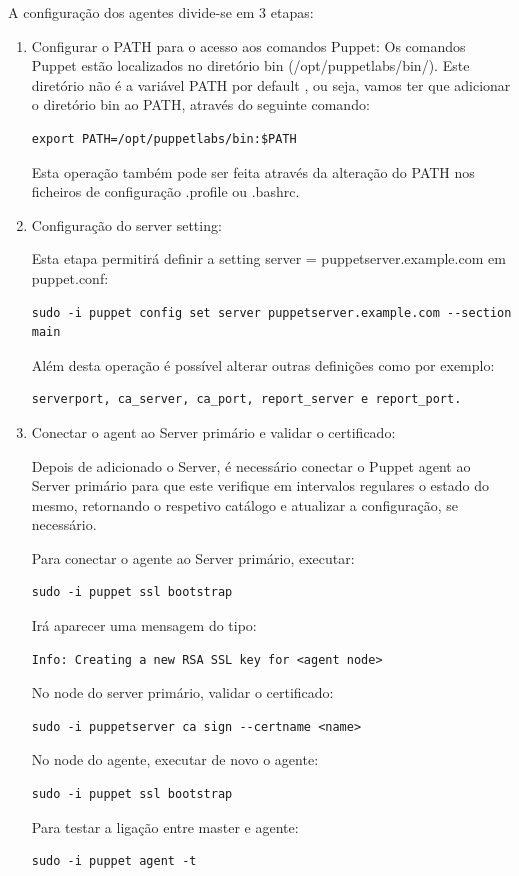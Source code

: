 \documentclass{article}
\begin{document}
A configuração dos agentes divide-se em 3 etapas:
\begin{enumerate}

\item Configurar o PATH para o acesso aos comandos Puppet:
Os comandos Puppet estão localizados no diretório bin (/opt/puppetlabs/bin/). Este diretório não é a variável PATH por default , ou seja, vamos ter que adicionar o diretório bin ao PATH, através do seguinte comando:
\begin{lstlisting}
export PATH=/opt/puppetlabs/bin:$PATH
\end{lstlisting}

Esta operação também pode ser feita através da alteração do PATH nos ficheiros de configuração .profile ou .bashrc.

\item Configuração do server setting:

Esta etapa permitirá definir a setting server = puppetserver.example.com em puppet.conf: 
\begin{lstlisting}
sudo -i puppet config set server puppetserver.example.com --section main
\end{lstlisting}

Além desta operação é possível alterar outras definições como por exemplo: 
\begin{lstlisting}
serverport, ca_server, ca_port, report_server e report_port. 
\end{lstlisting}


\item Conectar o agent ao Server primário e validar o certificado:

Depois de adicionado o Server, é necessário conectar o Puppet agent ao Server primário para que este verifique em intervalos regulares o estado do mesmo, retornando o respetivo catálogo e atualizar a configuração, se necessário.

Para conectar o agente ao Server primário, executar:
\begin{lstlisting}
sudo -i puppet ssl bootstrap
\end{lstlisting}

Irá aparecer uma mensagem do tipo:
\begin{lstlisting}
Info: Creating a new RSA SSL key for <agent node>
\end{lstlisting}

No node do server primário, validar o certificado:
\begin{lstlisting}
sudo -i puppetserver ca sign --certname <name>
\end{lstlisting}

No node do agente, executar de novo o agente:
\begin{lstlisting}
sudo -i puppet ssl bootstrap
\end{lstlisting}

Para testar a ligação entre master e agente:
\begin{lstlisting}
sudo -i puppet agent -t
\end{lstlisting}

\end{enumerate}
\end{document}
